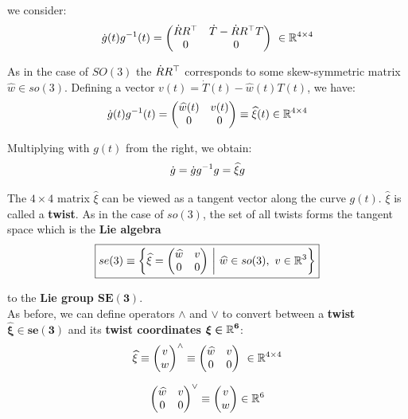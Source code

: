 we consider:
	\[\dot{g}(t)g^{-1}(t) = \begin{pmatrix}
		\dot{R}R^{\top} & \dot{T} - \dot{R}R^{\top}T \\
		0 & 0 \\
	\end{pmatrix}\ \in \mathbb{R}^{4 \times{} 4}\]

As in the case of $SO(3)$ the $\dot{R}R^{\top}$ corresponds
to some skew-symmetric matrix $\widehat{w} \in so(3)$. Defining a vector
$v(t) = \dot{T}(t) - \widehat{w}(t)T(t)$, we have:
	\[\dot{g}(t)g^{-1}(t) = \begin{pmatrix}
		\widehat{w}(t) & v(t) \\
		0 & 0 \\
	\end{pmatrix} \equiv \widehat{\xi}(t) \in \mathbb{R}^{4 \times{} 4}\]

Multiplying with $g(t)$ from the right, we obtain:
	\[\dot{g} = \dot{g}g^{-1}g = \widehat{\xi}g\]

The $4 \times 4$ matrix $\widehat{\xi}$ can be viewed as a tangent vector
along the curve $g(t)$. $\widehat{\xi}$ is called a \textbf{twist}.
As in the case of $so(3)$, the set of all twists forms the tangent
space which is the \textbf{Lie algebra}
	\[\boxed{se(3) \equiv \left\{ \widehat{\xi} = \begin{pmatrix}
		\widehat{w} & v \\
		0 & 0 \\
	\end{pmatrix}\ \middle|
	\ \widehat{w} \in so(3),\ v \in \mathbb{R}^3 \right\}}\]

	to the \textbf{Lie group $\bm{SE(3)}$}.\\

As before, we can define operators $\wedge$ and $\vee$ to convert between
a \textbf{twist $\bm{\widehat{\xi} \in se(3)}$} and its
\textbf{twist coordinates} $\bm{ \xi \in \mathbb{R}^6 }$:
	\[\widehat{\xi} \equiv \begin{pmatrix} v \\ w \end{pmatrix}^{\wedge}
		\equiv \begin{pmatrix}
			\widehat{w} & v \\
			0 & 0
		\end{pmatrix}\ \in \mathbb{R}^{4 \times{} 4}\]

	\[\begin{pmatrix}
		\widehat{w} & v \\
		0 & 0
	\end{pmatrix}^{\vee} \equiv \begin{pmatrix} v \\ w \end{pmatrix} \in \mathbb{R}^6\]


